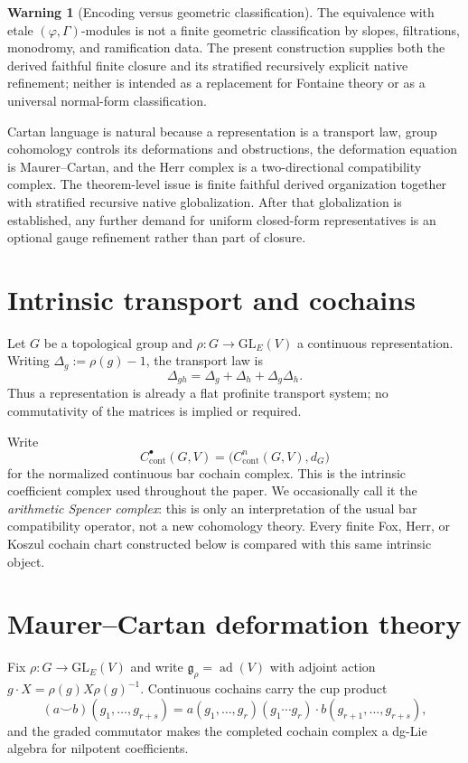 \documentclass[11pt]{article}
\theoremstyle{definition}
\newtheorem{warning}[theorem]{Warning}
\newcommand{\ad}{\operatorname{ad}}
\begin{document}
\begin{warning}[Encoding versus geometric classification]
The equivalence with etale $(\varphi,\Gamma)$-modules is not a finite geometric classification by slopes, filtrations, monodromy, and ramification data.  The present construction supplies both the derived faithful finite closure and its stratified recursively explicit native refinement; neither is intended as a replacement for Fontaine theory or as a universal normal-form classification.
\end{warning}

Cartan language is natural because a representation is a transport law, group cohomology controls its deformations and obstructions, the deformation equation is Maurer--Cartan, and the Herr complex is a two-directional compatibility complex.  The theorem-level issue is finite faithful derived organization together with stratified recursive native globalization.  After that globalization is established, any further demand for uniform closed-form representatives is an optional gauge refinement rather than part of closure.

\section{Intrinsic transport and cochains}

Let $G$ be a topological group and
$\rho:G\to\mathrm{GL}_E(V)$ a continuous representation.  Writing
$\Delta_g:=\rho(g)-1$, the transport law is
\[
 \Delta_{gh}=\Delta_g+\Delta_h+\Delta_g\Delta_h.
\]
Thus a representation is already a flat profinite transport system; no
commutativity of the matrices is implied or required.

Write
\[
 C^\bullet_{\mathrm{cont}}(G,V)
 =\bigl(C^n_{\mathrm{cont}}(G,V),d_G\bigr)
\]
for the normalized continuous bar cochain complex.  This is the intrinsic
coefficient complex used throughout the paper.  We occasionally call it the
\emph{arithmetic Spencer complex}: this is only an interpretation of the usual
bar compatibility operator, not a new cohomology theory.  Every finite Fox,
Herr, or Koszul cochain chart constructed below is compared with this same
intrinsic object.

\section{Maurer--Cartan deformation theory}\label{sec:deformation}

Fix $\rho:G\to\mathrm{GL}_E(V)$ and write $\mathfrak g_\rho=\ad(V)$ with adjoint action $g\cdot X=\rho(g)X\rho(g)^{-1}$.  Continuous cochains carry the cup product
\[
(a\smile b)(g_1,\dots,g_{r+s})
=a(g_1,\dots,g_r)(g_1\cdots g_r)\cdot b(g_{r+1},\dots,g_{r+s}),
\]
and the graded commutator makes the completed cochain complex a dg-Lie algebra for nilpotent coefficients.
\end{document}
